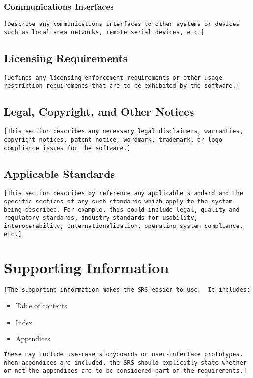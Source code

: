 \documentclass[a4paper,12pt,chapterprefix=false,bibliography=totoc,listof=totoc]{scrreprt}
\begin{document}
\subsection{Communications Interfaces}
\begin{verbatim}
[Describe any communications interfaces to other systems or devices such as local area networks, remote serial devices, etc.]
\end{verbatim}

\section{Licensing Requirements}
\begin{verbatim}
[Defines any licensing enforcement requirements or other usage restriction requirements that are to be exhibited by the software.]
\end{verbatim}

\section{Legal, Copyright, and Other Notices}
\begin{verbatim}
[This section describes any necessary legal disclaimers, warranties, copyright notices, patent notice, wordmark, trademark, or logo compliance issues for the software.]
\end{verbatim}

\section{Applicable Standards}
\begin{verbatim}
[This section describes by reference any applicable standard and the specific sections of any such standards which apply to the system being described. For example, this could include legal, quality and regulatory standards, industry standards for usability, interoperability, internationalization, operating system compliance, etc.]
\end{verbatim}

\chapter{Supporting Information}
\begin{verbatim}
[The supporting information makes the SRS easier to use.  It includes:
\end{verbatim}
\begin{itemize}
	\item Table of contents
	\item  Index
	\item Appendices
\end{itemize}
\begin{verbatim}
These may include use-case storyboards or user-interface prototypes. When appendices are included, the SRS should explicitly state whether or not the appendices are to be considered part of the requirements.]
\end{verbatim}
\end{document}
